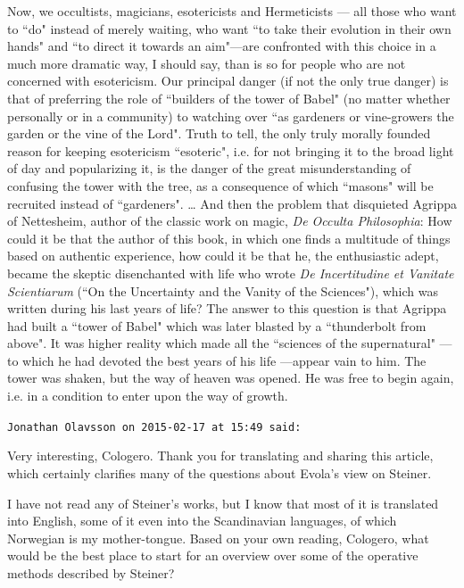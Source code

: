 \begin{footnotesize}
\begin{sffamily}
\begin{quotationx}\scriptsize
Now, we occultists, magicians, esotericists and Hermeticists — all those who want to ``do" instead of merely waiting, who want ``to take their evolution in their own hands" and ``to direct it towards an aim"—are confronted with this choice in a much more dramatic way, I should say, than is so for people who are not concerned with esotericism. Our principal danger (if not the only true danger) is that of preferring the role of ``builders of the tower of Babel" (no matter whether personally or in a community) to watching over ``as gardeners or vine-growers the garden or the vine of the Lord". Truth to tell, the only truly morally founded reason for keeping esotericism ``esoteric", i.e. for not bringing it to the broad light of day and popularizing it, is the danger of the great misunderstanding of confusing the tower with the tree, as a consequence of which ``masons" will be recruited instead of ``gardeners".
…
And then the problem that disquieted Agrippa of Nettesheim, author of the classic work on magic, \textit{De Occulta Philosophia}: How could it be that the author of this book, in which one finds a multitude of things based on authentic experience, how could it be that he, the enthusiastic adept, became the skeptic disenchanted with life who wrote \textit{De Incertitudine et Vanitate Scientiarum} (``On the Uncertainty and the Vanity of the Sciences"), which was written during his last years of life? The answer to this question is that Agrippa had built a ``tower of Babel" which was later blasted by a ``thunderbolt from above". It was higher reality which made all the ``sciences of the supernatural" —to which he had devoted the best years of his life —appear vain to him. The tower was shaken, but the way of heaven was opened. He was free to begin again, i.e. in a condition to enter upon the way of growth.
\end{quotationx}

\hfill

\texttt{Jonathan Olavsson on 2015-02-17 at 15:49 said: }

Very interesting, Cologero. Thank you for translating and sharing this article, which certainly clarifies many of the questions about Evola's view on Steiner.

I have not read any of Steiner's works, but I know that most of it is translated into English, some of it even into the Scandinavian languages, of which Norwegian is my mother-tongue. Based on your own reading, Cologero, what would be the best place to start for an overview over some of the operative methods described by Steiner?



\end{sffamily}
\end{footnotesize}

